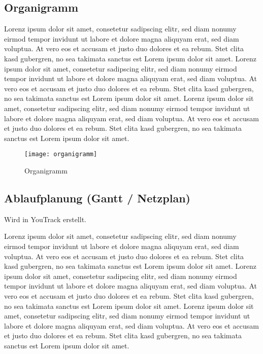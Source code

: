\subsection{Organigramm}\label{subsec:Organigramm}
Lorenz ipsum dolor sit amet, consetetur sadipscing elitr, sed diam nonumy eirmod tempor invidunt ut labore et dolore magna aliquyam erat, sed diam voluptua.
At vero eos et accusam et justo duo dolores et ea rebum.
Stet clita kasd gubergren, no sea takimata sanctus est Lorem ipsum dolor sit amet.
Lorenz ipsum dolor sit amet, consetetur sadipscing elitr, sed diam nonumy eirmod tempor invidunt ut labore et dolore magna aliquyam erat, sed diam voluptua.
At vero eos et accusam et justo duo dolores et ea rebum.
Stet clita kasd gubergren, no sea takimata sanctus est Lorem ipsum dolor sit amet.
Lorenz ipsum dolor sit amet, consetetur sadipscing elitr, sed diam nonumy eirmod tempor invidunt ut labore et dolore magna aliquyam erat, sed diam voluptua.
At vero eos et accusam et justo duo dolores et ea rebum.
Stet clita kasd gubergren, no sea takimata sanctus est Lorem ipsum dolor sit amet.

\begin{figure}[H]
    \centering
    \texttt{[image: organigramm]}
    \caption{Organigramm}
\end{figure}

\subsection{Ablaufplanung (Gantt / Netzplan)}\label{subsec:Ablaufplan}
Wird in YouTrack erstellt.

Lorenz ipsum dolor sit amet, consetetur sadipscing elitr, sed diam nonumy eirmod tempor invidunt ut labore et dolore magna aliquyam erat, sed diam voluptua.
At vero eos et accusam et justo duo dolores et ea rebum.
Stet clita kasd gubergren, no sea takimata sanctus est Lorem ipsum dolor sit amet.
Lorenz ipsum dolor sit amet, consetetur sadipscing elitr, sed diam nonumy eirmod tempor invidunt ut labore et dolore magna aliquyam erat, sed diam voluptua.
At vero eos et accusam et justo duo dolores et ea rebum.
Stet clita kasd gubergren, no sea takimata sanctus est Lorem ipsum dolor sit amet.
Lorenz ipsum dolor sit amet, consetetur sadipscing elitr, sed diam nonumy eirmod tempor invidunt ut labore et dolore magna aliquyam erat, sed diam voluptua.
At vero eos et accusam et justo duo dolores et ea rebum.
Stet clita kasd gubergren, no sea takimata sanctus est Lorem ipsum dolor sit amet.

